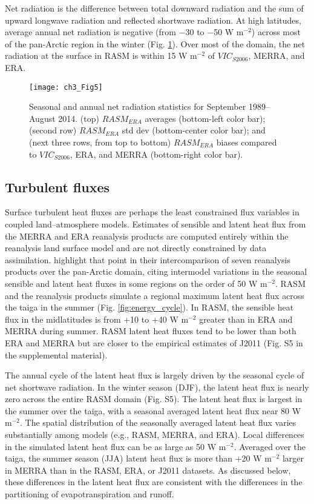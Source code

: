 Net radiation is the difference between total downward radiation and the sum of upward longwave radiation and reflected shortwave radiation.
At high latitudes, average annual net radiation is negative (from −30 to −50 W m$^{−2}$) across most of the pan-Arctic region in the winter (Fig. \ref{fig:nrad_maps}).
Over most of the domain, the net radiation at the surface in RASM is within 15 W m$^{−2}$ of $VIC_{S2006}$, MERRA, and ERA.

\begin{figure}
  \centering
  \texttt{[image: ch3\_Fig5]}
  \caption{Seasonal and annual net radiation statistics for September 1989–August 2014.
  (top) $RASM_{ERA}$ averages (bottom-left color bar); (second row) $RASM_{ERA}$ std dev (bottom-center color bar); and (next three rows, from top to bottom) $RASM_{ERA}$ biases compared to $VIC_{S2006}$, ERA, and MERRA (bottom-right color bar).}
  \label{fig:nrad_maps}
\end{figure}

\subsection{Turbulent fluxes}

Surface turbulent heat fluxes are perhaps the least constrained flux variables in coupled land–atmosphere models.
Estimates of sensible and latent heat flux from the MERRA and ERA reanalysis products are computed entirely within the reanalysis land surface model and are not directly constrained by data assimilation.
\citet{Lindsay_2014} highlight that point in their intercomparison of seven reanalysis products over the pan-Arctic domain, citing intermodel variations in the seasonal sensible and latent heat fluxes in some regions on the order of 50 W m$^{−2}$.
RASM and the reanalysis products simulate a regional maximum latent heat flux across the taiga in the summer (Fig. \ref{fig:energy_cycle}).
In RASM, the sensible heat flux in the midlatitudes is from +10 to +40 W m$^{−2}$ greater than in ERA and MERRA during summer.
RASM latent heat fluxes tend to be lower than both ERA and MERRA but are closer to the empirical estimates of J2011 (Fig. S5 in the supplemental material).

The annual cycle of the latent heat flux is largely driven by the seasonal cycle of net shortwave radiation.
In the winter season (DJF), the latent heat flux is nearly zero across the entire RASM domain (Fig. S5).
The latent heat flux is largest in the summer over the taiga, with a seasonal averaged latent heat flux near 80 W m$^{−2}$.
The spatial distribution of the seasonally averaged latent heat flux varies substantially among models (e.g., RASM, MERRA, and ERA).
Local differences in the simulated latent heat flux can be as large as 50 W m$^{−2}$.
Averaged over the taiga, the summer season (JJA) latent heat flux is more than +20 W m$^{−2}$ larger in MERRA than in the RASM, ERA, or J2011 datasets.
As discussed below, these differences in the latent heat flux are consistent with the differences in the partitioning of evapotranspiration and runoff.

